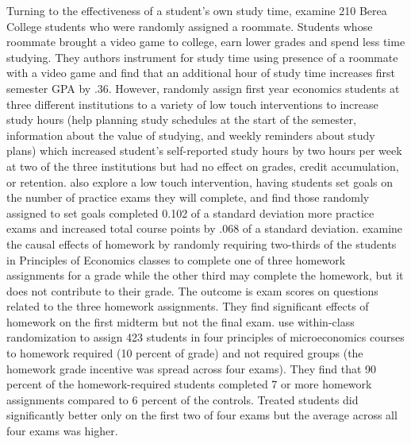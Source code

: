 \documentclass[12pt]{article}
\begin{document}
Turning to the effectiveness of a student's own study time, \textcite{ss2008} examine 210 Berea College students who were randomly assigned a roommate. Students whose roommate brought a video game to college, earn lower grades and spend less time studying. They authors instrument for study time using presence of a roommate with a video game and find that an additional hour of study time increases first semester GPA by .36. However, \textcite{oppp2019} randomly assign first year economics students at three different institutions to a variety of low touch interventions to increase study hours (help planning study schedules at the start of the semester, information about the value of studying, and weekly reminders about study plans) which increased student's self-reported study hours by two hours per week at two of the three institutions but had no effect on grades, credit accumulation, or retention. \textcite{cgpr2020} also explore a low touch intervention, having students set goals on the number of practice exams they will complete, and find those randomly assigned to set goals completed 0.102 of a standard deviation more practice exams and increased total course points by .068 of a standard deviation. \textcite{ts2012} examine the causal effects of homework by randomly requiring two-thirds of the students in Principles of Economics classes to complete one of three homework assignments for a grade while the other third may complete the homework, but it does not contribute to their grade. The outcome is exam scores on questions related to the three homework assignments. They find significant effects of homework on the first midterm but not the final exam. \textcite{gr2013} use within-class randomization to assign 423 students in four principles of microeconomics courses to homework required (10 percent of grade) and not required groups (the homework grade incentive was spread across four exams). They find that 90 percent of the homework-required students completed 7 or more homework assignments compared to 6 percent of the controls. Treated students did significantly better only on the first two of four exams but the average across all four exams was higher.
\end{document}

